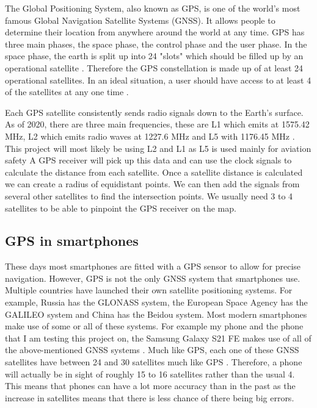 \documentclass{l4proj}
\begin{document}
The Global Positioning System, also known as GPS, is one of the world's most famous Global Navigation Satellite Systems (GNSS). It allows people to determine their
location from anywhere around the world at any time. GPS has three main phases, the space phase, the control phase and the user phase.
In the space phase, the earth is split up into 24 "slots" which should be filled up by an operational satellite \citep{spsStandard}. Therefore
the GPS constellation is made up of at least 24 operational satellites. In an ideal situation, a user should have access to at least 4 of the satellites
at any one time \citep{Rabbany2006}. 

Each GPS satellite consistently sends radio signals down to the Earth's surface. As of 2020, there are three main frequencies,
these are L1 which emits at 1575.42 MHz, L2 which emits radio waves at 1227.6 MHz and L5 with 1176.45 MHz \citep{spsStandard}. This project
will most likely be using L2 and L1 as L5 is used mainly for aviation safety \citep{Xu2016} A GPS receiver will pick up this data and can use the clock signals to calculate the distance from each satellite. Once a 
satellite distance is calculated we can create a radius of equidistant points. We can then add the signals from several other
satellites to find the intersection points. We usually need 3 to 4 satellites to be able to pinpoint the GPS receiver on the map. \citep{Rabbany2006}


\subsection{GPS in smartphones}
These days most smartphones are fitted with a GPS sensor to allow for precise navigation. However, GPS is not the only GNSS
system that smartphones use. Multiple countries have launched their own satellite positioning systems. For example, Russia has the GLONASS
system, the European Space Agency has the GALILEO system and China has the Beidou system. Most modern smartphones make use
of some or all of these systems. For example my phone and the phone that I am testing this project on, the Samsung 
Galaxy S21 FE makes use of all of the above-mentioned GNSS systems \citep{samsungs21specs}. Much like GPS, each one of these GNSS satellites
have between 24 and 30 satellites much like GPS \citep{Leick2015}. Therefore, a phone will actually be in sight of roughly 15 to 16 satellites rather than the usual 4. This means that phones can
have a lot more accuracy than in the past as the increase in satellites means that there is less chance of there being big
errors.
\end{document}

